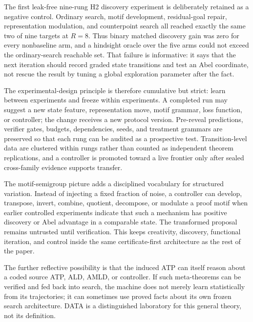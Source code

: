 The first leak-free nine-rung H2 discovery experiment is deliberately retained as a negative control. Ordinary search, motif development, residual-goal repair, representation modulation, and counterpoint search all reached exactly the same two of nine targets at $R=8$. Thus binary matched discovery gain was zero for every nonbaseline arm, and a hindsight oracle over the five arms could not exceed the ordinary-search reachable set. That failure is informative: it says that the next iteration should record graded state transitions and test an Abel coordinate, not rescue the result by tuning a global exploration parameter after the fact.

The experimental-design principle is therefore cumulative but strict: learn between experiments and freeze within experiments. A completed run may suggest a new state feature, representation move, motif grammar, loss function, or controller; the change receives a new protocol version. Pre-reveal predictions, verifier gates, budgets, dependencies, seeds, and treatment grammars are preserved so that each rung can be audited as a prospective test. Transition-level data are clustered within rungs rather than counted as independent theorem replications, and a controller is promoted toward a live frontier only after sealed cross-family evidence supports transfer.

The motif-semigroup picture adds a disciplined vocabulary for structured variation. Instead of injecting a fixed fraction of noise, a controller can develop, transpose, invert, combine, quotient, decompose, or modulate a proof motif when earlier controlled experiments indicate that such a mechanism has positive discovery or Abel advantage in a comparable state. The transformed proposal remains untrusted until verification. This keeps creativity, discovery, functional iteration, and control inside the same certificate-first architecture as the rest of the paper.

The further reflective possibility is that the induced ATP can itself reason about a coded source ATP, ALD, AMLD, or controller. If such meta-theorems can be verified and fed back into search, the machine does not merely learn statistically from its trajectories; it can sometimes use proved facts about its own frozen search architecture. DATA is a distinguished laboratory for this general theory, not its definition.
